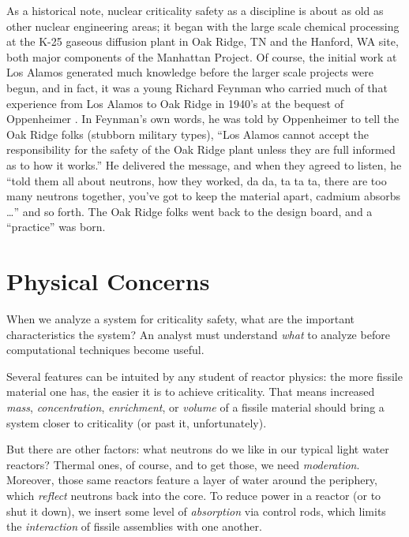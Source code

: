 As a historical note, nuclear criticality safety as a discipline is 
about as old as other nuclear 
engineering areas; it began with the large scale chemical processing at
the K-25 gaseous diffusion plant in Oak Ridge, TN and the Hanford, WA site, 
both major components of the 
Manhattan Project.  Of course, the initial work at Los Alamos generated 
much knowledge before the larger scale projects were begun, and in fact, 
it was a young Richard Feynman who carried much of that experience from 
Los Alamos to Oak Ridge in 1940's at the bequest of Oppenheimer 
\cite{something}. In Feynman's own words, he was told by Oppenheimer to
tell the Oak Ridge folks (stubborn military types), ``Los Alamos cannot 
accept the responsibility
for the safety of the Oak Ridge plant unless they are full informed as
to how it works.''  He delivered the message, and when they agreed to 
listen, he
``told them all about neutrons, how they worked, da da, ta ta ta,
there are too many neutrons together, you've got to keep the material
apart, cadmium absorbs \ldots'' and so forth.  The Oak Ridge folks
went back to the design board, and a ``practice'' was born.


\section*{Physical Concerns}

When we analyze a system for criticality safety, what are the important 
characteristics the system?  An analyst must understand \textit{what} to
analyze before computational techniques become useful.

Several features can be intuited by any
student of reactor physics: the more fissile material one has, the easier
it is to achieve criticality.  That means increased 
\textit{mass}, \textit{concentration}, \textit{enrichment}, or 
\textit{volume} of a fissile material should bring
a system closer to criticality (or past it, unfortunately).

But there are other factors: what neutrons do we like in our typical light
water reactors?  Thermal ones, of course, and to get those, we need 
\textit{moderation}.  Moreover, those same reactors feature a layer of
water around the periphery, which \textit{reflect} neutrons back into
the core.  To reduce power in a reactor (or to shut it down), we insert
some level of \textit{absorption} via control rods, which limits
the \textit{interaction} of fissile assemblies with one another. 

